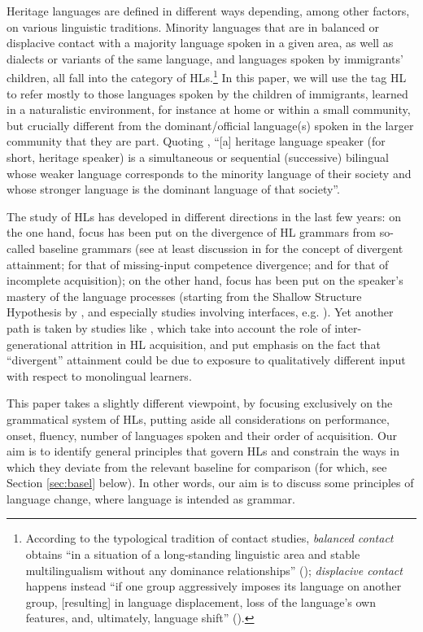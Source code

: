 \documentclass[output=paper]{langscibook}
\begin{document}
Heritage languages are defined in different ways depending, among other factors, on various linguistic traditions. Minority languages that are in balanced or displacive contact with a majority language spoken in a given area, as well as dialects or variants of the same language, and languages spoken by immigrants' children, all fall into the category of HLs.\footnote{According to the typological tradition of contact studies, \textit{balanced contact} obtains ``in a situation of a long-standing linguistic area and stable multilingualism without any dominance relationships'' (\citealt[42]{Aikhenvald2006}); \textit{displacive contact} happens instead ``if one group aggressively imposes its language on another group, [resulting] in language displacement, loss of the language's own features, and, ultimately, language shift'' (\citealt[43]{Aikhenvald2006}).} In this paper, we will use the tag HL to refer mostly to those languages spoken by the children of immigrants, learned in a naturalistic environment, for instance at home or within a small community, but crucially different from the dominant/official language(s) spoken in the larger community that they are part. Quoting \citet[9]{Polinsky2018}, ``[a] heritage language speaker (for short, heritage speaker) is a simultaneous
or sequential (successive) bilingual whose weaker language corresponds to the minority language of their society and whose stronger language is the dominant language of that society''.

The study of HLs has developed in different directions in the last few years: on the one hand, focus has been put on the divergence of HL grammars from so-called baseline grammars (see at least discussion in \citealt[1.3.3]{Polinsky2018} for the concept of divergent attainment; \citealt{PiresRothman2009} for that of missing-input competence divergence; and \citealt{Montrul2008} for that of incomplete acquisition); on the other hand, focus has been put on the speaker's mastery of the language processes (starting from the Shallow Structure Hypothesis by \citealt{ClahsenFelser2006}, and especially studies involving interfaces, e.g. \citealt{Sorace2011}). Yet another path is taken by studies like \citet{Bayrametal2019}, which take into account the role of inter-generational attrition in HL acquisition, and put emphasis on the fact that ``divergent'' attainment could be due to exposure to qualitatively different input with respect to monolingual learners.

This paper takes a slightly different viewpoint, by focusing exclusively on the grammatical system of HLs, putting aside all considerations on performance, onset, fluency, number of languages spoken and their order of acquisition. Our aim is to identify general principles that govern HLs and constrain the ways in which they deviate from the relevant baseline for comparison (for which, see Section \ref{sec:basel} below). In other words, our aim is to discuss some principles of language change, where language is intended as grammar.
\end{document}
